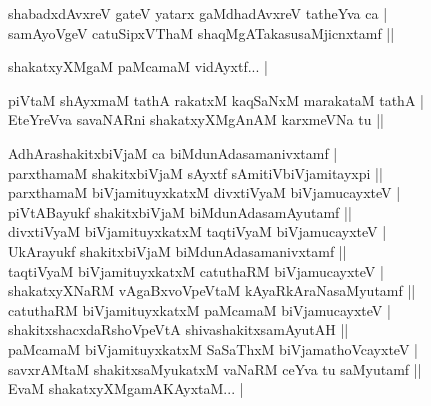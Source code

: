 \begin{entry}
\smallskip
\begin{shl}
shabadxdAvxreV gateV yatarx gaMdhadAvxreV tatheYva ca |\\
samAyoVgeV catuSipxVThaM shaqMgATakasusaMjicnxtamf ||
\end{shl}
\smallskip
{}
\smallskip
{}
\end{entry}

\begin{entry}
\smallskip
\begin{shl}
shakatxyXMgaM paMcamaM vidAyxtf... |
\end{shl}
\smallskip
{}
\smallskip
\begin{shl}
piVtaM shAyxmaM tathA rakatxM kaqSaNxM marakataM tathA |\\
EteYreVva savaNARni shakatxyXMgAnAM karxmeVNa tu ||
\end{shl}
\smallskip
{}
\smallskip
\begin{shl}
AdhArashakitxbiVjaM ca biMdunAdasamanivxtamf |\\
parxthamaM shakitxbiVjaM sAyxtf sAmitiVbiVjamitayxpi ||\\
parxthamaM biVjamituyxkatxM divxtiVyaM biVjamucayxteV |\\
piVtABayukf shakitxbiVjaM biMdunAdasamAyutamf ||\\
divxtiVyaM biVjamituyxkatxM taqtiVyaM biVjamucayxteV |\\
UkArayukf shakitxbiVjaM biMdunAdasamanivxtamf ||\\
taqtiVyaM biVjamituyxkatxM catuthaRM biVjamucayxteV |\\
shakatxyXNaRM vAgaBxvoVpeVtaM kAyaRkAraNasaMyutamf ||\\
catuthaRM biVjamituyxkatxM paMcamaM biVjamucayxteV |\\
shakitxshacxdaRshoVpeVtA shivashakitxsamAyutAH ||\\
paMcamaM biVjamituyxkatxM SaSaThxM biVjamathoVcayxteV |\\
savxrAMtaM shakitxsaMyukatxM vaNaRM ceYva tu saMyutamf ||\\
EvaM shakatxyXMgamAKAyxtaM... |
\end{shl}
\smallskip
{}
\smallskip
{}
\end{entry}

